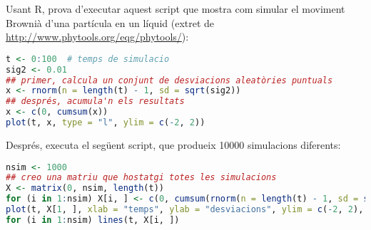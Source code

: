 \begin{exr}{}
Usant R, prova d'executar aquest script que mostra com simular el moviment Brownià d'una partícula en un líquid (extret de \url{http://www.phytools.org/eqg/phytools/}):
\begin{lstlisting}[language=R]
t <- 0:100  # temps de simulacio
sig2 <- 0.01
## primer, calcula un conjunt de desviacions aleatòries puntuals
x <- rnorm(n = length(t) - 1, sd = sqrt(sig2))
## després, acumula'n els resultats
x <- c(0, cumsum(x))
plot(t, x, type = "l", ylim = c(-2, 2))
\end{lstlisting}

Després, executa el següent script, que produeix 10000 simulacions diferents:

\begin{lstlisting}[language=R]
nsim <- 1000
## creo una matriu que hostatgi totes les simulacions
X <- matrix(0, nsim, length(t))
for (i in 1:nsim) X[i, ] <- c(0, cumsum(rnorm(n = length(t) - 1, sd = sqrt(sig2))))
plot(t, X[1, ], xlab = "temps", ylab = "desviacions", ylim = c(-2, 2), type = "l")
for (i in 1:nsim) lines(t, X[i, ])
\end{lstlisting}
\end{exr}
